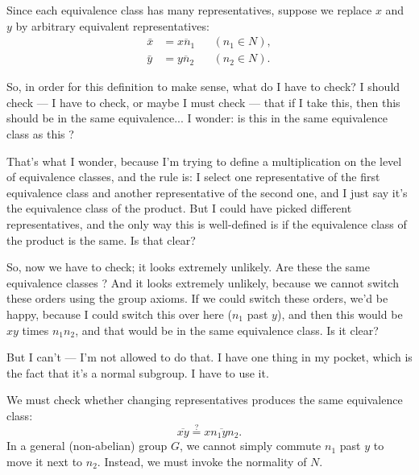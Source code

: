 \begin{proofWrapper}
\begin{content}
Since each equivalence class has many representatives, suppose we replace $x$ and $y$ by arbitrary equivalent representatives:
\begin{align*}
\bar{x} &= \overline{x n_1} && (n_1 \in N), \\
\bar{y} &= \overline{y n_2} && (n_2 \in N).
\end{align*}
\end{content}

\begin{speech}[01:00:08 - 01:01:37]
So, in order for this definition to make sense, what do I have to check? I should check --- I have to check, or maybe I must check  --- that if I take this, then this should be in the same equivalence... I wonder: is this in the same equivalence class as this ?

That's what I wonder, because I'm trying to define a multiplication on the level of equivalence classes, and the rule is: I select one representative of the first equivalence class and another representative of the second one, and I just say it's the equivalence class of the product. But I could have picked different representatives, and the only way this is well-defined is if the equivalence class of the product is the same. Is that clear?

So, now we have to check; it looks extremely unlikely. Are these the same equivalence classes ? And it looks extremely unlikely, because we cannot switch these orders  using the group axioms. If we could switch these orders, we'd be happy, because I could switch this over here ($n_1$ past $y$), and then this would be $x y$ times $n_1 n_2$, and that would be in the same equivalence class. Is it clear?

But I can't --- I'm not allowed to do that. I have one thing in my pocket, which is the fact that it's a normal subgroup. I have to use it.
\end{speech}

\begin{content}
We must check whether changing representatives produces the same equivalence class:
\[
\overline{xy} \stackrel{?}{=} \overline{x n_1 y n_2}.
\]
In a general (non-abelian) group $G$, we cannot simply commute $n_1$ past $y$ to move it next to $n_2$. Instead, we must invoke the normality of $N$.
\end{content}


\end{proofWrapper}
